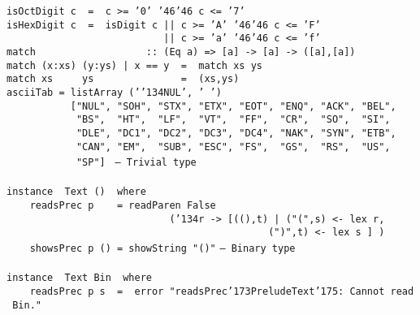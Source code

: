 %
\eprogB\noindent\bprogB
\mbox{\tt isOctDigit\ c\ \ =\ \ c\ >=\ '0'\ {\char'46}{\char'46}\ c\ <=\ '7'}\\
\mbox{\tt isHexDigit\ c\ \ =\ \ isDigit\ c\ ||\ c\ >=\ 'A'\ {\char'46}{\char'46}\ c\ <=\ 'F'}\\
\mbox{\tt \ \ \ \ \ \ \ \ \ \ \ \ \ \ \ \ \ \ \ \ \ \ \ \ \ \ \ ||\ c\ >=\ 'a'\ {\char'46}{\char'46}\ c\ <=\ 'f'}
\eprogB\noindent\bprogB
\mbox{\tt match\ \ \ \ \ \ \ \ \ \ \ \ \ \ \ \ \ \ \ ::\ (Eq\ a)\ =>\ [a]\ ->\ [a]\ ->\ ([a],[a])}\\
\mbox{\tt match\ (x:xs)\ (y:ys)\ |\ x\ ==\ y\ \ =\ \ match\ xs\ ys}\\
\mbox{\tt match\ xs\ \ \ \ \ ys\ \ \ \ \ \ \ \ \ \ \ \ \ \ \ =\ \ (xs,ys)}
%
\eprogB\noindent\bprogB
\mbox{\tt asciiTab\ =\ listArray\ ('{\char'134}NUL',\ '\ ')}\\
\mbox{\tt \ \ \ \ \ \ \ \ \ \ \ ["NUL",\ "SOH",\ "STX",\ "ETX",\ "EOT",\ "ENQ",\ "ACK",\ "BEL",}\\
\mbox{\tt \ \ \ \ \ \ \ \ \ \ \ \ "BS",\ \ "HT",\ \ "LF",\ \ "VT",\ \ "FF",\ \ "CR",\ \ "SO",\ \ "SI",\ }\\
\mbox{\tt \ \ \ \ \ \ \ \ \ \ \ \ "DLE",\ "DC1",\ "DC2",\ "DC3",\ "DC4",\ "NAK",\ "SYN",\ "ETB",}\\
\mbox{\tt \ \ \ \ \ \ \ \ \ \ \ \ "CAN",\ "EM",\ \ "SUB",\ "ESC",\ "FS",\ \ "GS",\ \ "RS",\ \ "US",\ }\\
\mbox{\tt \ \ \ \ \ \ \ \ \ \ \ \ "SP"]\ }
\eprogB\noindent\bprogB
\mbox{\tt --\ Trivial\ type}\\
\mbox{\tt }\\[-8pt]
\mbox{\tt instance\ \ Text\ ()\ \ where}\\
\mbox{\tt \ \ \ \ readsPrec\ p\ \ \ \ =\ readParen\ False}\\
\mbox{\tt \ \ \ \ \ \ \ \ \ \ \ \ \ \ \ \ \ \ \ \ \ \ \ \ \ \ \ \ ({\char'134}r\ ->\ [((),t)\ |\ ("(",s)\ <-\ lex\ r,}\\
\mbox{\tt \ \ \ \ \ \ \ \ \ \ \ \ \ \ \ \ \ \ \ \ \ \ \ \ \ \ \ \ \ \ \ \ \ \ \ \ \ \ \ \ \ \ \ \ \ (")",t)\ <-\ lex\ s\ ]\ )}\\
\mbox{\tt \ \ \ \ showsPrec\ p\ ()\ =\ showString\ "()"}
\eprogB\noindent\bprogB
\mbox{\tt --\ Binary\ type}\\
\mbox{\tt }\\[-8pt]
\mbox{\tt instance\ \ Text\ Bin\ \ where}\\
\mbox{\tt \ \ \ \ readsPrec\ p\ s\ \ =\ \ error\ "readsPrec{\char'173}PreludeText{\char'175}:\ Cannot\ read\ Bin."}\\
